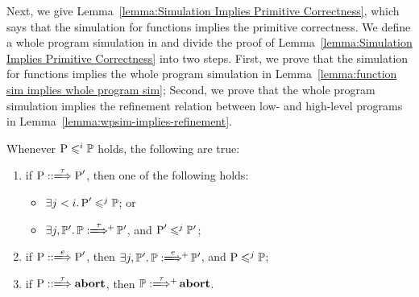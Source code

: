 Next, we give
Lemma~\ref{lemma:Simulation Implies Primitive Correctness},
which says that the simulation for functions implies
the primitive correctness. We define a whole program
simulation in \Def{\ref{def:wpsim}} and divide
the proof of
Lemma~\ref{lemma:Simulation Implies Primitive Correctness}
into two steps.
First, we prove
that the simulation for functions implies
the whole program simulation in
Lemma~\ref{lemma:function sim implies whole program sim};
Second, we prove that
the whole program simulation implies the refinement relation
between low- and high-level programs in
Lemma~\ref{lemma:wpsim-implies-refinement}.
\begin{definition}
    \label{def:wpsim}
    Whenever {\em $\text{P} \leqslant^{i} \mathbb{P}$} holds,
    the following are true:
    \begin{enumerate}[1.]
        \small
        \item if {\em $\LGlobTrans{\prog}{\tau}{\prog'}$},
            then one of the following holds:
            \begin{itemize}
                \item {\em $\exists j < i. \,
                        \text{P}' \leqslant^{j} \mathbb{P}$}; or
                \item {\em $\exists j, \HProg'. \,
                    \HGlobMultiTrans{\HProg}{\tau}{+}{\HProg'}$},
                    and {\em $\text{P}' \leqslant^{j} \mathbb{P}'$};
            \end{itemize}
        \item if {\em $\LGlobTrans{\prog}{\event}{\prog'}$},
            then {\em $\exists j, \HProg'. \,
            \HGlobMultiTrans{\HProg}{\event}{+}{\HProg'}$},
            and {\em $\text{P} \leqslant^{j} \mathbb{P}$};
        \item if {\em $\LGlobTrans{\prog}{\tau}{\evtabort}$},
            then {\em $\HGlobMultiTrans{\HProg}{\tau}{+}{\evtabort}$}.
    \end{enumerate}
\end{definition}

